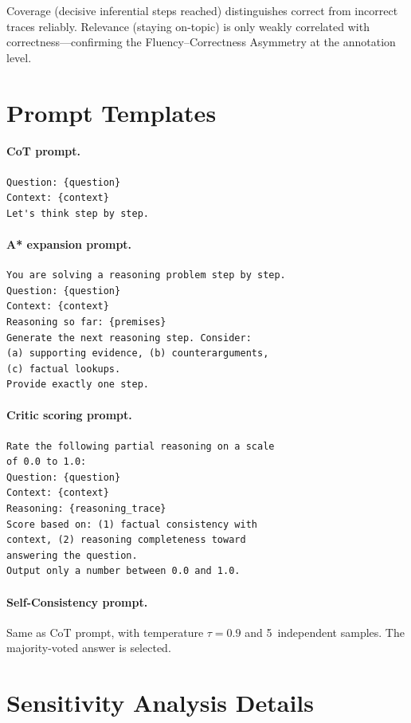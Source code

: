 \documentclass{article}
\begin{document}
Coverage (decisive inferential steps reached) distinguishes correct from
incorrect traces reliably.  Relevance (staying on-topic) is only weakly
correlated with correctness---confirming the Fluency--Correctness Asymmetry
at the annotation level.

\section{Prompt Templates}
\label{app:prompts}

\paragraph{CoT prompt.}
\begin{verbatim}
Question: {question}
Context: {context}
Let's think step by step.
\end{verbatim}

\paragraph{A* expansion prompt.}
\begin{verbatim}
You are solving a reasoning problem step by step.
Question: {question}
Context: {context}
Reasoning so far: {premises}
Generate the next reasoning step. Consider:
(a) supporting evidence, (b) counterarguments,
(c) factual lookups.
Provide exactly one step.
\end{verbatim}

\paragraph{Critic scoring prompt.}
\begin{verbatim}
Rate the following partial reasoning on a scale
of 0.0 to 1.0:
Question: {question}
Context: {context}
Reasoning: {reasoning_trace}
Score based on: (1) factual consistency with
context, (2) reasoning completeness toward
answering the question.
Output only a number between 0.0 and 1.0.
\end{verbatim}

\paragraph{Self-Consistency prompt.}
Same as CoT prompt, with temperature $\tau = 0.9$ and 5~independent samples.
The majority-voted answer is selected.

\section{Sensitivity Analysis Details}
\label{app:sensitivity}
\end{document}
